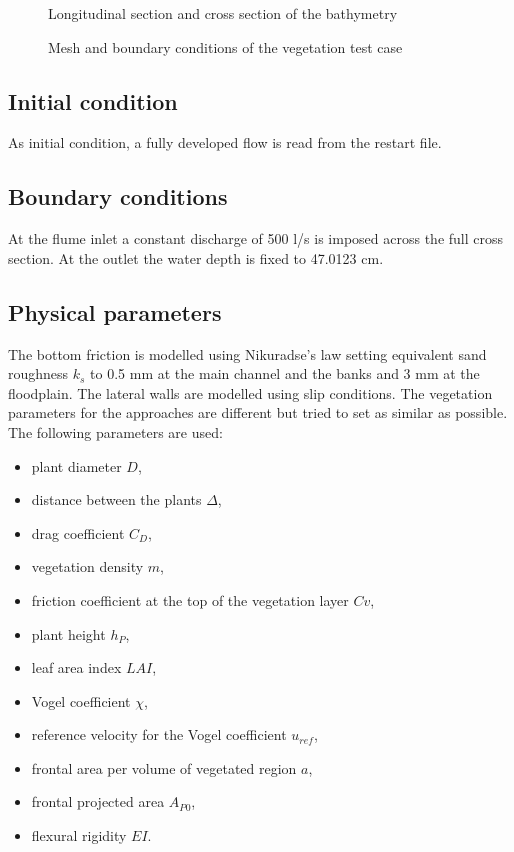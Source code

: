 \begin{figure}[h!]
\centering
{}

\caption{Longitudinal section and cross section of the bathymetry}
\label{t2d:vegetation:bathy}
\end{figure}

\begin{figure}[h!]
\centering
{}
\caption{Mesh and boundary conditions of the vegetation test case}
\label{t2d:vegetation:mesh}
\end{figure}

\subsection{Initial condition}

As initial condition, a fully developed flow is read from the restart file.

\subsection{Boundary conditions}

At the flume inlet a constant discharge of 500 l/s is imposed across the full
cross section. At the outlet the water depth is fixed to 47.0123 cm.

\subsection{Physical parameters}

The bottom friction is modelled using Nikuradse's law setting equivalent sand
roughness $k_s$ to 0.5 mm at the main channel and the banks and 3 mm at the floodplain.
The lateral walls are modelled using slip conditions.
The vegetation parameters for the approaches are different but tried to set
as similar as possible. The following parameters are used: 
\begin{itemize}
\item plant diameter $D$, 
\item distance between the plants $\Delta$, 
\item drag coefficient $C_D$, 
\item vegetation density $m$, 
\item friction coefficient at the top of the vegetation layer $Cv$, 
\item plant height $h_P$, 
\item leaf area index $LAI$, 
\item Vogel coefficient $\chi$, 
\item reference velocity for the Vogel coefficient $u_{ref}$, 
\item frontal area per volume of vegetated region $a$, 
\item frontal projected area $A_{P0}$, 
\item flexural rigidity $EI$.
\end{itemize}


